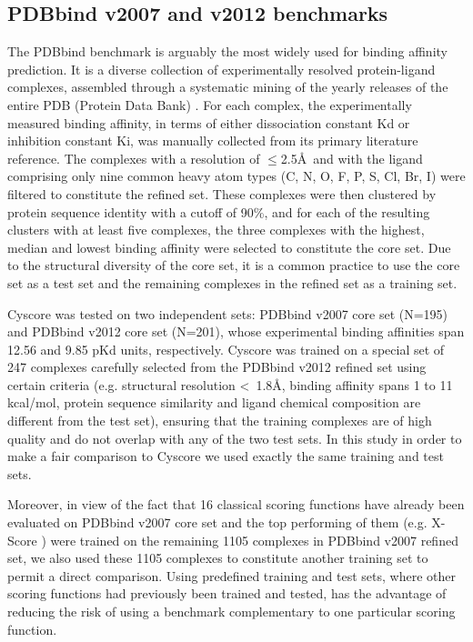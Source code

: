 \subsection{PDBbind v2007 and v2012 benchmarks}

The PDBbind \citep{529,530} benchmark is arguably the most widely used for binding affinity prediction. It is a diverse collection of experimentally resolved protein-ligand complexes, assembled through a systematic mining of the yearly releases of the entire PDB (Protein Data Bank) \citep{540,537}. For each complex, the experimentally measured binding affinity, in terms of either dissociation constant Kd or inhibition constant Ki, was manually collected from its primary literature reference. The complexes with a resolution of $\le$2.5\AA\ and with the ligand comprising only nine common heavy atom types (C, N, O, F, P, S, Cl, Br, I) were filtered to constitute the refined set. These complexes were then clustered by protein sequence identity with a cutoff of 90\%, and for each of the resulting clusters with at least five complexes, the three complexes with the highest, median and lowest binding affinity were selected to constitute the core set. Due to the structural diversity of the core set, it is a common practice to use the core set as a test set and the remaining complexes in the refined set as a training set.

Cyscore was tested on two independent sets: PDBbind v2007 core set (N=195) and PDBbind v2012 core set (N=201), whose experimental binding affinities span 12.56 and 9.85 pKd units, respectively. Cyscore was trained on a special set of 247 complexes carefully selected from the PDBbind v2012 refined set using certain criteria \citep{1372} (e.g. structural resolution \textless\ 1.8\AA, binding affinity spans 1 to 11 kcal/mol, protein sequence similarity and ligand chemical composition are different from the test set), ensuring that the training complexes are of high quality and do not overlap with any of the two test sets. In this study in order to make a fair comparison to Cyscore we used exactly the same training and test sets.

Moreover, in view of the fact that 16 classical scoring functions have already been evaluated \citep{1313} on PDBbind v2007 core set and the top performing of them (e.g. X-Score \citep{573}) were trained on the remaining 1105 complexes in PDBbind v2007 refined set, we also used these 1105 complexes to constitute another training set to permit a direct comparison. Using predefined training and test sets, where other scoring functions had previously been trained and tested, has the advantage of reducing the risk of using a benchmark complementary to one particular scoring function.

